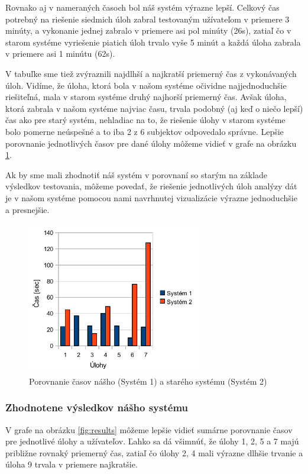 Rovnako aj v nameraných časoch bol náš systém výrazne lepší. Celkový čas potrebný na riešenie siedmich úloh zabral testovaným užívateľom v priemere 3 minúty, a vykonanie jednej zabralo v priemere asi pol minúty (26s), zatiaľ čo v starom systéme vyriešenie piatich úloh trvalo vyše 5 minút a každá úloha zabrala v priemere asi 1 minútu (62s).

V tabuľke sme tiež zvýraznili najdlhší a najkratší priemerný čas z vykonávaných úloh. Vidíme, že úloha, ktorá bola v našom systéme očividne najjednoduchšie riešiteľná, mala v starom systéme druhý najhorší priemerný čas. Avšak úloha, ktorá zabrala v našom systéme najviac času, trvala podobný (aj keď o niečo lepší) čas ako pre starý systém, nehladiac na to, že riešenie úlohy v starom systéme bolo pomerne neúspešné a to iba 2 z 6 subjektov odpovedalo správne. Lepšie porovnanie jednotlivých časov pre dané úlohy môžeme vidieť v grafe na obrázku \ref{fig:times}.

Ak by sme mali zhodnotiť náš systém v porovnaní so starým na základe výsledkov testovania, môžeme povedať, že riešenie jednotlivých úloh analýzy dát je v našom systéme pomocou nami navrhnutej vizualizácie výrazne jednoduchšie a presnejšie.

\begin{figure}
	\centering
	\includegraphics[width = 3in]{times}
	\caption{Porovnanie časov nášho (Systém 1) a starého systému (Systém 2)}
	\label{fig:times} 
\end{figure}

\subsubsection{Zhodnotene výsledkov nášho systému}
V grafe na obrázku \ref{fig:results} môžeme lepšie vidieť sumárne porovnanie časov pre jednotlivé úlohy a užívateľov. Ľahko sa dá všimnúť, že úlohy 1, 2, 5 a 7 majú približne rovnaký priemerný čas, zatiaľ čo úlohy 2, 4 mali výrazne dlhšie trvanie a úloha 9 trvala v priemere najkratšie.

